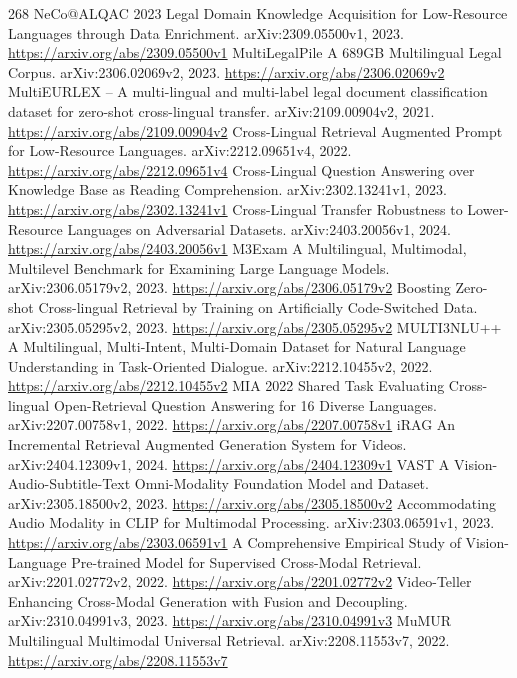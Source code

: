 \documentclass[11pt]{article}
\begin{document}
\begin{thebibliography}{268}
 NeCo@ALQAC 2023 Legal Domain Knowledge Acquisition for Low-Resource Languages through Data Enrichment. arXiv:2309.05500v1, 2023. \url{https://arxiv.org/abs/2309.05500v1}
 MultiLegalPile A 689GB Multilingual Legal Corpus. arXiv:2306.02069v2, 2023. \url{https://arxiv.org/abs/2306.02069v2}
 MultiEURLEX -- A multi-lingual and multi-label legal document classification dataset for zero-shot cross-lingual transfer. arXiv:2109.00904v2, 2021. \url{https://arxiv.org/abs/2109.00904v2}
 Cross-Lingual Retrieval Augmented Prompt for Low-Resource Languages. arXiv:2212.09651v4, 2022. \url{https://arxiv.org/abs/2212.09651v4}
 Cross-Lingual Question Answering over Knowledge Base as Reading Comprehension. arXiv:2302.13241v1, 2023. \url{https://arxiv.org/abs/2302.13241v1}
 Cross-Lingual Transfer Robustness to Lower-Resource Languages on Adversarial Datasets. arXiv:2403.20056v1, 2024. \url{https://arxiv.org/abs/2403.20056v1}
 M3Exam A Multilingual, Multimodal, Multilevel Benchmark for Examining Large Language Models. arXiv:2306.05179v2, 2023. \url{https://arxiv.org/abs/2306.05179v2}
 Boosting Zero-shot Cross-lingual Retrieval by Training on Artificially Code-Switched Data. arXiv:2305.05295v2, 2023. \url{https://arxiv.org/abs/2305.05295v2}
 MULTI3NLU++ A Multilingual, Multi-Intent, Multi-Domain Dataset for Natural Language Understanding in Task-Oriented Dialogue. arXiv:2212.10455v2, 2022. \url{https://arxiv.org/abs/2212.10455v2}
 MIA 2022 Shared Task Evaluating Cross-lingual Open-Retrieval Question Answering for 16 Diverse Languages. arXiv:2207.00758v1, 2022. \url{https://arxiv.org/abs/2207.00758v1}
 iRAG An Incremental Retrieval Augmented Generation System for Videos. arXiv:2404.12309v1, 2024. \url{https://arxiv.org/abs/2404.12309v1}
 VAST A Vision-Audio-Subtitle-Text Omni-Modality Foundation Model and Dataset. arXiv:2305.18500v2, 2023. \url{https://arxiv.org/abs/2305.18500v2}
 Accommodating Audio Modality in CLIP for Multimodal Processing. arXiv:2303.06591v1, 2023. \url{https://arxiv.org/abs/2303.06591v1}
 A Comprehensive Empirical Study of Vision-Language Pre-trained Model for Supervised Cross-Modal Retrieval. arXiv:2201.02772v2, 2022. \url{https://arxiv.org/abs/2201.02772v2}
 Video-Teller Enhancing Cross-Modal Generation with Fusion and Decoupling. arXiv:2310.04991v3, 2023. \url{https://arxiv.org/abs/2310.04991v3}
 MuMUR Multilingual Multimodal Universal Retrieval. arXiv:2208.11553v7, 2022. \url{https://arxiv.org/abs/2208.11553v7}

\end{thebibliography}
\end{document}
